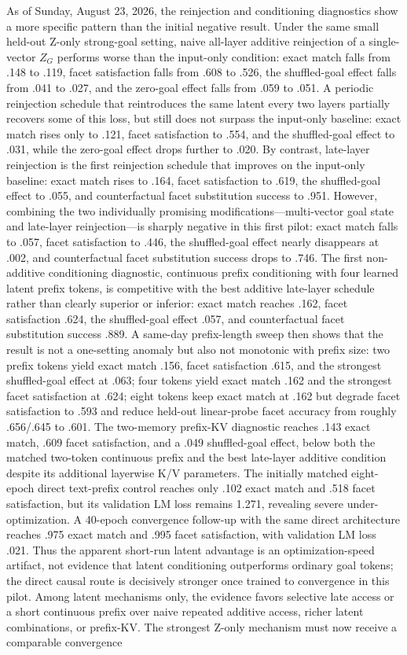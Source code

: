 \documentclass[11pt]{article}
\begin{document}
As of Sunday, August 23, 2026, the reinjection and conditioning diagnostics show a more specific pattern than the initial negative result. Under the same small held-out Z-only strong-goal setting, naive all-layer additive reinjection of a single-vector $Z_G$ performs worse than the input-only condition: exact match falls from .148 to .119, facet satisfaction falls from .608 to .526, the shuffled-goal effect falls from .041 to .027, and the zero-goal effect falls from .059 to .051. A periodic reinjection schedule that reintroduces the same latent every two layers partially recovers some of this loss, but still does not surpass the input-only baseline: exact match rises only to .121, facet satisfaction to .554, and the shuffled-goal effect to .031, while the zero-goal effect drops further to .020. By contrast, late-layer reinjection is the first reinjection schedule that improves on the input-only baseline: exact match rises to .164, facet satisfaction to .619, the shuffled-goal effect to .055, and counterfactual facet substitution success to .951. However, combining the two individually promising modifications---multi-vector goal state and late-layer reinjection---is sharply negative in this first pilot: exact match falls to .057, facet satisfaction to .446, the shuffled-goal effect nearly disappears at .002, and counterfactual facet substitution success drops to .746. The first non-additive conditioning diagnostic, continuous prefix conditioning with four learned latent prefix tokens, is competitive with the best additive late-layer schedule rather than clearly superior or inferior: exact match reaches .162, facet satisfaction .624, the shuffled-goal effect .057, and counterfactual facet substitution success .889. A same-day prefix-length sweep then shows that the result is not a one-setting anomaly but also not monotonic with prefix size: two prefix tokens yield exact match .156, facet satisfaction .615, and the strongest shuffled-goal effect at .063; four tokens yield exact match .162 and the strongest facet satisfaction at .624; eight tokens keep exact match at .162 but degrade facet satisfaction to .593 and reduce held-out linear-probe facet accuracy from roughly .656/.645 to .601. The two-memory prefix-KV diagnostic reaches .143 exact match, .609 facet satisfaction, and a .049 shuffled-goal effect, below both the matched two-token continuous prefix and the best late-layer additive condition despite its additional layerwise K/V parameters. The initially matched eight-epoch direct text-prefix control reaches only .102 exact match and .518 facet satisfaction, but its validation LM loss remains 1.271, revealing severe under-optimization. A 40-epoch convergence follow-up with the same direct architecture reaches .975 exact match and .995 facet satisfaction, with validation LM loss .021. Thus the apparent short-run latent advantage is an optimization-speed artifact, not evidence that latent conditioning outperforms ordinary goal tokens; the direct causal route is decisively stronger once trained to convergence in this pilot. Among latent mechanisms only, the evidence favors selective late access or a short continuous prefix over naive repeated additive access, richer latent combinations, or prefix-KV. The strongest Z-only mechanism must now receive a comparable convergence 
\end{document}

